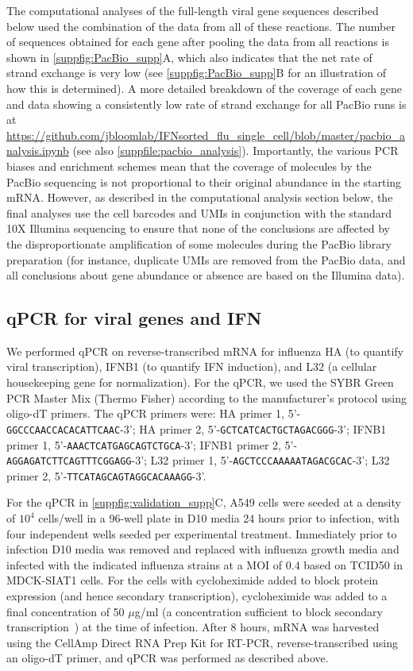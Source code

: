 \documentclass[10pt,letterpaper]{article}
\newcommand{\SUPPFILE}[1]{\autoref{suppfile:#1}}
\newcommand{\SUPPFIG}[1]{\autoref{suppfig:#1}}
\begin{document}
The computational analyses of the full-length viral gene sequences described below used the combination of the data from all of these reactions.
The number of sequences obtained for each gene after pooling the data from all reactions is shown in \SUPPFIG{PacBio_supp}A, which also indicates that the net rate of strand exchange is very low (see \SUPPFIG{PacBio_supp}B for an illustration of how this is determined).
A more detailed breakdown of the coverage of each gene and data showing a consistently low rate of strand exchange for all PacBio runs is at \url{https://github.com/jbloomlab/IFNsorted_flu_single_cell/blob/master/pacbio_analysis.ipynb} (see also \SUPPFILE{pacbio_analysis}).
Importantly, the various PCR biases and enrichment schemes mean that the coverage of molecules by the PacBio sequencing is not proportional to their original abundance in the starting mRNA.
However, as described in the computational analysis section below, the final analyses use the cell barcodes and UMIs in conjunction with the standard 10X Illumina sequencing to ensure that none of the conclusions are affected by the disproportionate amplification of some molecules during the PacBio library preparation (for instance, duplicate UMIs are removed from the PacBio data, and all conclusions about gene abundance or absence are based on the Illumina data).

\subsection*{qPCR for viral genes and IFN}
We performed qPCR on reverse-transcribed mRNA for influenza HA (to quantify viral transcription), IFNB1 (to quantify IFN induction), and L32 (a cellular housekeeping gene for normalization).
For the qPCR, we used the SYBR Green PCR Master Mix (Thermo Fisher) according to the manufacturer's protocol using oligo-dT primers.
The qPCR primers were: HA primer 1, 5'-\texttt{GGCCCAACCACACATTCAAC}-3'; HA primer 2, 5'-\texttt{GCTCATCACTGCTAGACGGG}-3'; IFNB1 primer 1, 5'-\texttt{AAACTCATGAGCAGTCTGCA}-3'; IFNB1 primer 2, 5'-\texttt{AGGAGATCTTCAGTTTCGGAGG}-3'; L32 primer 1, 5'-\texttt{AGCTCCCAAAAATAGACGCAC}-3'; L32 primer 2, 5'-\texttt{TTCATAGCAGTAGGCACAAAGG}-3'. 

For the qPCR in \SUPPFIG{validation_supp}C, A549 cells were seeded at a density of $10^4$ cells/well in a 96-well plate in D10 media 24 hours prior to infection, with four independent wells seeded per experimental treatment. 
Immediately prior to infection D10 media was removed and replaced with influenza growth media and infected with the indicated influenza strains at a MOI of 0.4 based on TCID50 in MDCK-SIAT1 cells.
For the cells with cycloheximide added to block protein expression (and hence secondary transcription), cycloheximide was added to a final concentration of 50 $\mu$g/ml (a concentration sufficient to block secondary transcription~\citep{killip2014activation}) at the time of infection.
After 8 hours, mRNA was harvested using the CellAmp Direct RNA Prep Kit for RT-PCR, reverse-transcribed using an oligo-dT primer, and qPCR was performed as described above.
\end{document}
